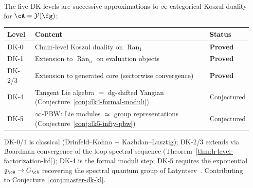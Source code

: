 \begin{remark}
\label{rem:unified-dk-hierarchy}
The five DK levels are successive approximations to $\infty$-categorical Koszul duality for $\cA = \mathcal{Y}(\fg)$:
\begin{center}
\renewcommand{\arraystretch}{1.2}
\begin{tabular}{lll}
\textbf{Level} & \textbf{Content} & \textbf{Status} \\
\hline
DK-0 & Chain-level Koszul duality on $\operatorname{Ran}_1$
  & \textbf{Proved} \\
DK-1 & Extension to $\operatorname{Ran}_n$ on evaluation objects
  & \textbf{Proved} \\
DK-2/3 & Extension to generated core (sectorwise convergence)
  & \textbf{Proved} \\
DK-4 & Tangent Lie algebra $=$ dg-shifted Yangian (Conjecture~\ref{conj:dk4-formal-moduli})
  & Conjectured \\
DK-5 & $\infty$-PBW: Lie modules $\simeq$ group representations (Conjecture~\ref{conj:dk5-infty-pbw})
  & Conjectured \\
\end{tabular}
\end{center}
DK-0/1 is classical (Drinfeld--Kohno $+$ Kazhdan--Lusztig); DK-2/3 extends via Boardman convergence of the loop spectral sequence (Theorem~\ref{thm:h-level-factorization-kd}); DK-4 is the formal moduli step; DK-5 requires the exponential $\mathfrak{g}_{\cA} \to G_{\cA}$ recovering the spectral quantum group of Latyntsev~\cite{Latyntsev23}.  Contributing to Conjecture~\ref{conj:master-dk-kl}.
\end{remark}

